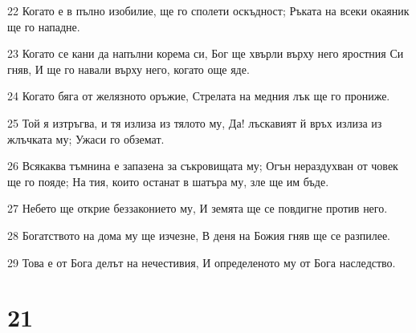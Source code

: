 \par 22 Когато е в пълно изобилие, ще го сполети оскъдност; Ръката на всеки окаяник ще го нападне.
\par 23 Когато се кани да напълни корема си, Бог ще хвърли върху него яростния Си гняв, И ще го навали върху него, когато още яде.
\par 24 Когато бяга от желязното оръжие, Стрелата на медния лък ще го прониже.
\par 25 Той я изтръгва, и тя излиза из тялото му, Да! лъскавият й връх излиза из жлъчката му; Ужаси го обземат.
\par 26 Всякаква тъмнина е запазена за съкровищата му; Огън нераздухван от човек ще го пояде; На тия, които останат в шатъра му, зле ще им бъде.
\par 27 Небето ще открие беззаконието му, И земята ще се повдигне против него.
\par 28 Богатството на дома му ще изчезне, В деня на Божия гняв ще се разпилее.
\par 29 Това е от Бога делът на нечестивия, И определеното му от Бога наследство.

\chapter{21}

